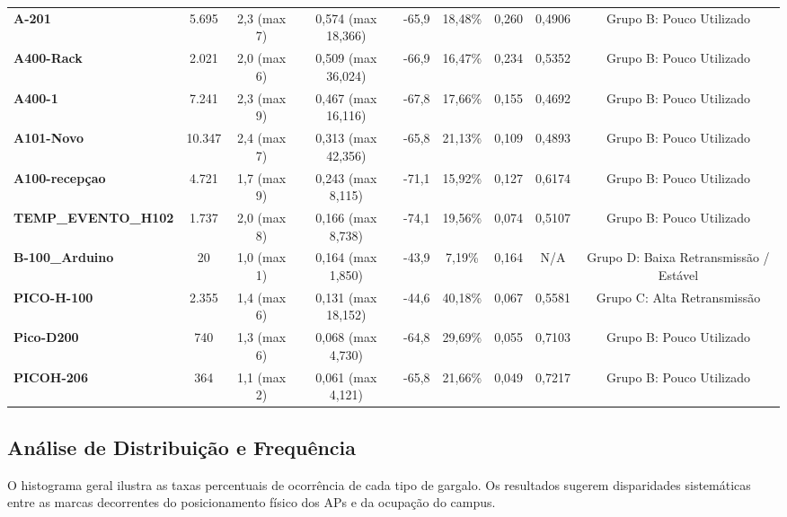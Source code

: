 \begin{table}[H]
{{\begin{tabular}{lcccccccc}
      \textbf{A-201} & 5.695 & 2,3 (max 7) & 0,574 (max 18,366) & -65,9 & 18,48\% & 0,260 & 0,4906 & Grupo B: Pouco Utilizado \\
      \textbf{A400-Rack} & 2.021 & 2,0 (max 6) & 0,509 (max 36,024) & -66,9 & 16,47\% & 0,234 & 0,5352 & Grupo B: Pouco Utilizado \\
      \textbf{A400-1} & 7.241 & 2,3 (max 9) & 0,467 (max 16,116) & -67,8 & 17,66\% & 0,155 & 0,4692 & Grupo B: Pouco Utilizado \\
      \textbf{A101-Novo} & 10.347 & 2,4 (max 7) & 0,313 (max 42,356) & -65,8 & 21,13\% & 0,109 & 0,4893 & Grupo B: Pouco Utilizado \\
      \textbf{A100-recepçao} & 4.721 & 1,7 (max 9) & 0,243 (max 8,115) & -71,1 & 15,92\% & 0,127 & 0,6174 & Grupo B: Pouco Utilizado \\
      \textbf{TEMP\_EVENTO\_H102} & 1.737 & 2,0 (max 8) & 0,166 (max 8,738) & -74,1 & 19,56\% & 0,074 & 0,5107 & Grupo B: Pouco Utilizado \\
      \textbf{B-100\_Arduino} & 20 & 1,0 (max 1) & 0,164 (max 1,850) & -43,9 & 7,19\% & 0,164 & N/A & Grupo D: Baixa Retransmissão / Estável \\
      \textbf{PICO-H-100} & 2.355 & 1,4 (max 6) & 0,131 (max 18,152) & -44,6 & 40,18\% & 0,067 & 0,5581 & Grupo C: Alta Retransmissão \\
      \textbf{Pico-D200} & 740 & 1,3 (max 6) & 0,068 (max 4,730) & -64,8 & 29,69\% & 0,055 & 0,7103 & Grupo B: Pouco Utilizado \\
      \textbf{PICOH-206} & 364 & 1,1 (max 2) & 0,061 (max 4,121) & -65,8 & 21,66\% & 0,049 & 0,7217 & Grupo B: Pouco Utilizado \\
      \bottomrule
    \end{tabular}%
  }%
}{%
}
\end{table}


\subsection{Análise de Distribuição e Frequência}

O histograma geral ilustra as taxas percentuais de ocorrência de cada tipo de gargalo. Os resultados sugerem disparidades sistemáticas entre as marcas decorrentes do posicionamento físico dos APs e da ocupação do campus.

